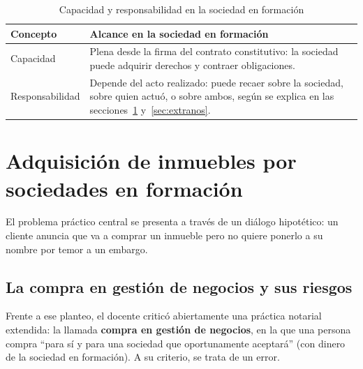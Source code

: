 \documentclass[12pt,oneside]{book}
\begin{document}
\begin{table}[H]
\centering
\caption{Capacidad y responsabilidad en la sociedad en formación}
\renewcommand{\arraystretch}{1.25}
\begin{tabularx}{\textwidth}{
    >{\raggedright\arraybackslash}p{}
    >{\raggedright\arraybackslash}X
}
\toprule
\textbf{Concepto} & \textbf{Alcance en la sociedad en formación} \\
\midrule
Capacidad & Plena desde la firma del contrato constitutivo: la sociedad puede adquirir derechos y contraer obligaciones. \\
Responsabilidad & Depende del acto realizado: puede recaer sobre la sociedad, sobre quien actuó, o sobre ambos, según se explica en las secciones~\ref{sec:adquisicion} y~\ref{sec:extranos}. \\
\bottomrule
\end{tabularx}
\end{table}

\section{Adquisición de inmuebles por sociedades en formación}
\label{sec:adquisicion}

El problema práctico central se presenta a través de un diálogo hipotético: un cliente anuncia que va a comprar un inmueble pero no quiere ponerlo a su nombre por temor a un embargo.

\subsection{La compra en gestión de negocios y sus riesgos}

Frente a ese planteo, el docente criticó abiertamente una práctica notarial extendida: la llamada \textbf{compra en gestión de negocios}, en la que una persona compra ``para sí y para una sociedad que oportunamente aceptará'' (con dinero de la sociedad en formación). A su criterio, se trata de un error.
\end{document}

